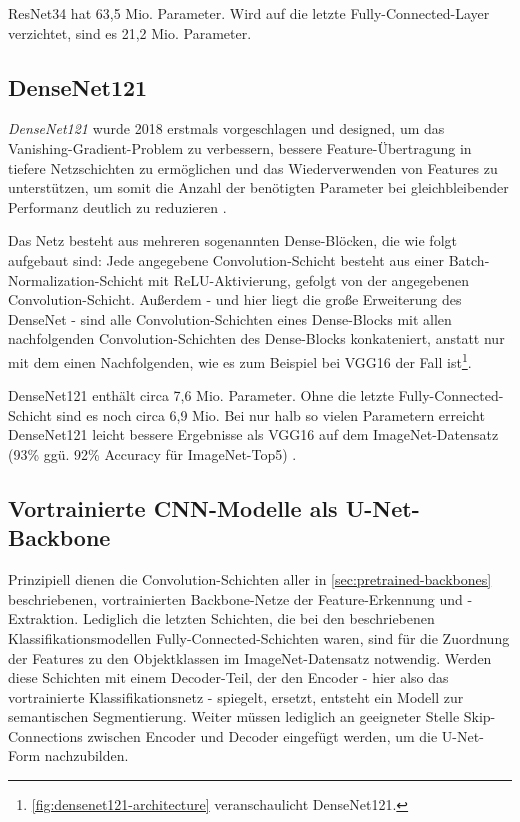 ResNet34 hat 63,5 Mio. Parameter. Wird auf die letzte Fully-Connected-Layer verzichtet, sind es 21,2 Mio. Parameter.

\subsection{DenseNet121} \label{sec:pretrained-backbones:densenet121}

\textit{DenseNet121} wurde 2018 erstmals vorgeschlagen und designed, um das Vanishing-Gradient-Problem 
zu verbessern, bessere Feature-Übertragung in tiefere Netzschichten zu ermöglichen und das Wiederverwenden von Features 
zu unterstützen, um somit die Anzahl der benötigten Parameter bei gleichbleibender Performanz deutlich zu reduzieren \cite{Huang.25082016}.

Das Netz besteht aus mehreren sogenannten Dense-Blöcken, die wie folgt aufgebaut sind: 
Jede angegebene Convolution-Schicht besteht aus einer Batch-Normalization-Schicht mit \ac{ReLU}-Aktivierung,
gefolgt von der angegebenen Convolution-Schicht. Außerdem - und hier liegt die große Erweiterung des DenseNet - sind alle 
Convolution-Schichten eines Dense-Blocks mit allen nachfolgenden Convolution-Schichten des Dense-Blocks konkateniert,
anstatt nur mit dem einen Nachfolgenden, wie es zum Beispiel bei VGG16 der Fall ist\footnote{\autoref{fig:densenet121-architecture} veranschaulicht DenseNet121.}. 

DenseNet121 enthält circa 7,6 Mio. Parameter. Ohne die letzte Fully-Connected-Schicht sind es noch circa 6,9 Mio. 
Bei nur halb so vielen Parametern erreicht DenseNet121 leicht bessere Ergebnisse als VGG16 auf dem ImageNet-Datensatz 
(93\% ggü. 92\% Accuracy für ImageNet-Top5) \cite{Huang.25082016}. 

\subsection{Vortrainierte CNN-Modelle als U-Net-Backbone} \label{sec:pretrained-as-unet-backbone}

Prinzipiell dienen die Convolution-Schichten aller in \autoref{sec:pretrained-backbones} beschriebenen, vortrainierten Backbone-Netze 
der Feature-Erkennung und -Extraktion. Lediglich die letzten Schichten, die bei den beschriebenen Klassifikationsmodellen  
Fully-Connected-Schichten waren, sind für die Zuordnung der Features zu den Objektklassen 
im ImageNet-Datensatz notwendig. Werden diese Schichten mit einem Decoder-Teil, der den Encoder - hier 
also das vortrainierte Klassifikationsnetz - spiegelt, ersetzt, entsteht ein Modell zur semantischen Segmentierung. 
Weiter müssen lediglich an geeigneter Stelle Skip-Connections zwischen Encoder und Decoder eingefügt werden,
um die U-Net-Form nachzubilden. 


